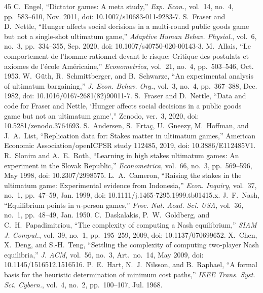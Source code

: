 \documentclass[journal]{IEEEtran}
\begin{document}
\begin{thebibliography}{45}
C.~Engel, ``Dictator games: A meta study,''
\emph{Exp. Econ.}, vol.~14, no.~4, pp.~583--610, Nov. 2011, doi: 10.1007/s10683-011-9283-7.
S.~Fraser and D.~Nettle, ``Hunger affects social decisions in a multi-round public goods game but not a single-shot ultimatum game,''
\emph{Adaptive Human Behav. Physiol.}, vol.~6, no.~3, pp.~334--355, Sep. 2020, doi: 10.1007/s40750-020-00143-3.
M.~Allais, ``Le comportement de l'homme rationnel devant le risque: Critique des postulats et axiomes de l'\'{e}cole Am\'{e}ricaine,''
\emph{Econometrica}, vol.~21, no.~4, pp.~503--546, Oct. 1953.
W.~G\"{u}th, R.~Schmittberger, and B.~Schwarze, ``An experimental analysis of ultimatum bargaining,''
\emph{J. Econ. Behav. Org.}, vol.~3, no.~4, pp.~367--388, Dec. 1982, doi: 10.1016/0167-2681(82)90011-7.
S.~Fraser and D.~Nettle, ``Data and code for Fraser and Nettle, `Hunger affects social decisions in a public goods game but not an ultimatum game','' Zenodo, ver.~3, 2020, doi: 10.5281/zenodo.3764693.
S.~Andersen, S.~Erta\c{c}, U.~Gneezy, M.~Hoffman, and J.~A.~List, ``Replication data for: Stakes matter in ultimatum games,''
American Economic Association/openICPSR study 112485, 2019, doi: 10.3886/E112485V1.
R.~Slonim and A.~E.~Roth, ``Learning in high stakes ultimatum games: An experiment in the Slovak Republic,''
\emph{Econometrica}, vol.~66, no.~3, pp.~569--596, May 1998, doi: 10.2307/2998575.
L.~A.~Cameron, ``Raising the stakes in the ultimatum game: Experimental evidence from Indonesia,''
\emph{Econ. Inquiry}, vol.~37, no.~1, pp.~47--59, Jan. 1999, doi: 10.1111/j.1465-7295.1999.tb01415.x.
J.~F.~Nash, ``Equilibrium points in $n$-person games,''
\emph{Proc. Nat. Acad. Sci. USA}, vol.~36, no.~1, pp.~48--49, Jan. 1950.
C.~Daskalakis, P.~W.~Goldberg, and C.~H.~Papadimitriou, ``The complexity of computing a Nash equilibrium,''
\emph{SIAM J. Comput.}, vol.~39, no.~1, pp.~195--259, 2009, doi: 10.1137/070699652.
X.~Chen, X.~Deng, and S.-H.~Teng, ``Settling the complexity of computing two-player Nash equilibria,''
\emph{J. ACM}, vol.~56, no.~3, Art.~no.~14, May 2009, doi: 10.1145/1516512.1516516.
P.~E.~Hart, N.~J.~Nilsson, and B.~Raphael, ``A formal basis for the heuristic determination of minimum cost paths,''
\emph{IEEE Trans. Syst. Sci. Cybern.}, vol.~4, no.~2, pp.~100--107, Jul. 1968.
\end{thebibliography}
\end{document}
